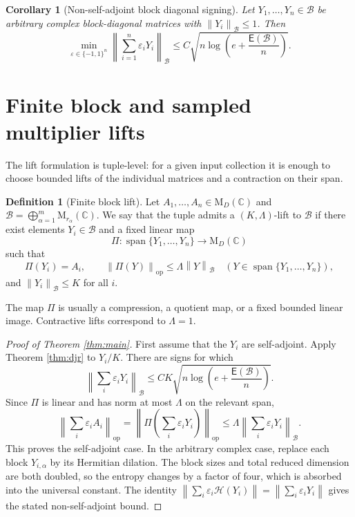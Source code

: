 \documentclass[11pt]{amsart}
\numberwithin{equation}{section}
\newtheorem{corollary}[theorem]{Corollary}
\theoremstyle{definition}
\newtheorem{definition}[theorem]{Definition}
\theoremstyle{remark}
\newcommand{\C}{\mathbb C}
\newcommand{\M}{\mathrm M}
\newcommand{\op}{\mathrm{op}}
\newcommand{\Span}{\operatorname{span}}
\newcommand{\Ent}{\mathsf E}
\newcommand{\norm}[1]{\left\lVert #1\right\rVert}
\newcommand{\eps}{\varepsilon}
\newcommand{\mcB}{\mathcal B}
\begin{document}
\begin{corollary}[Non-self-adjoint block diagonal signing]\label{cor:nsa}
Let $Y_1,\ldots,Y_n\in\mcB$ be arbitrary complex block-diagonal matrices with
$\norm{Y_i}_{\mcB}\le 1$. Then
\[
\min_{\eps\in\{-1,1\}^n}
\norm{\sum_{i=1}^n \eps_iY_i}_{\mcB}
\le C\sqrt{n\log\left(e+\frac{\Ent(\mcB)}{n}\right)} .
\]
\end{corollary}

\section{Finite block and sampled multiplier lifts}

The lift formulation is tuple-level: for a given input collection it is enough
to choose bounded lifts of the individual matrices and a contraction on their
span.

\begin{definition}[Finite block lift]
Let $A_1,\ldots,A_n\in\M_D(\C)$ and
$\mcB=\bigoplus_{\alpha=1}^m \M_{r_\alpha}(\C)$. We say that the tuple admits a
$(K,\Lambda)$-lift to $\mcB$ if there exist elements $Y_i\in\mcB$ and a fixed
linear map
\[
\Pi:\Span\{Y_1,\ldots,Y_n\}\to\M_D(\C)
\]
such that
\[
\Pi(Y_i)=A_i,
\qquad
\norm{\Pi(Y)}_{\op}\le \Lambda\norm{Y}_{\mcB}
\quad (Y\in\Span\{Y_1,\ldots,Y_n\}),
\]
and $\norm{Y_i}_{\mcB}\le K$ for all $i$.
\end{definition}

The map $\Pi$ is usually a compression, a quotient map, or a fixed bounded
linear image. Contractive lifts correspond to $\Lambda=1$.

\begin{proof}[Proof of Theorem \ref{thm:main}]
First assume that the $Y_i$ are self-adjoint. Apply Theorem
\ref{thm:djr} to $Y_i/K$. There are signs for which
\[
\norm{\sum_i \eps_i Y_i}_{\mcB}
\le C K\sqrt{n\log\left(e+\frac{\Ent(\mcB)}{n}\right)} .
\]
Since $\Pi$ is linear and has norm at most $\Lambda$ on the relevant span,
\[
\norm{\sum_i \eps_i A_i}_{\op}
= \norm{\Pi\left(\sum_i \eps_iY_i\right)}_{\op}
\le \Lambda\norm{\sum_i \eps_iY_i}_{\mcB} .
\]
This proves the self-adjoint case. In the arbitrary complex case, replace each
block $Y_{i,\alpha}$ by its Hermitian dilation. The block sizes and total
reduced dimension are both doubled, so the entropy changes by a factor of four,
which is absorbed into the universal constant. The identity
$\norm{\sum_i\eps_i\mathscr H(Y_i)}=\norm{\sum_i\eps_iY_i}$ gives the stated
non-self-adjoint bound.
\end{proof}
\end{document}
